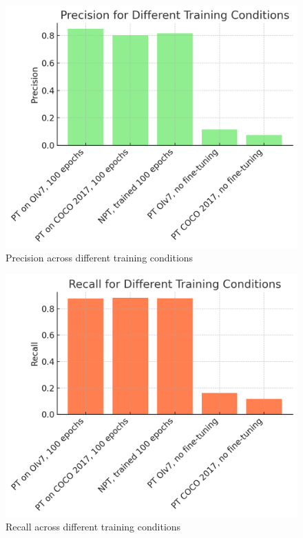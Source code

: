 \documentclass[10pt,twocolumn,letterpaper]{article}
\begin{document}
\begin{figure}[H]
    \centering
    \includegraphics[width=0.8\linewidth]{precision.png}
    \caption{Precision across different training conditions}
    \label{fig:precision}
\end{figure}

\begin{figure}[H]
    \centering
    \includegraphics[width=0.8\linewidth]{recall.png}
    \caption{Recall across different training conditions}
    \label{fig:recall}
\end{figure}
\end{document}
